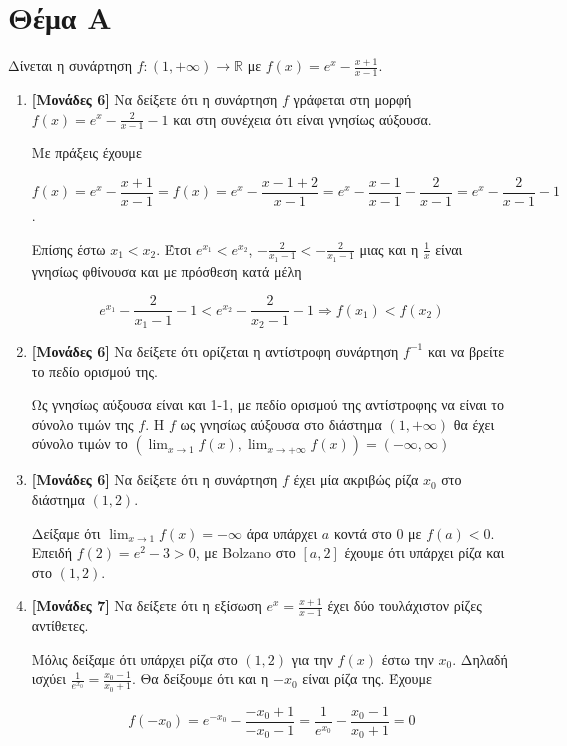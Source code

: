\documentclass[12pt]{article}
\begin{document}
\section*{Θέμα Α}
  \noindent
  Δίνεται η συνάρτηση $f:(1,+\infty)\to \mathbb{R}$ με $f(x)=e^x-\frac{x+1}{x-1}$.
  \begin{enumerate}
    \item \textbf{[Μονάδες 6]} Να δείξετε ότι η συνάρτηση $f$ γράφεται στη μορφή $f(x)=e^x-\frac{2}{x-1}-1$ και στη συνέχεια ότι είναι γνησίως αύξουσα.

    Με πράξεις έχουμε

    $$f(x)=e^x-\frac{x+1}{x-1}=f(x)=e^x-\frac{x-1+2}{x-1}=e^x-\frac{x-1}{x-1}-\frac{2}{x-1}=e^x-\frac{2}{x-1}-1$$.

    Επίσης έστω $x_1<x_2$. Έτσι $e^{x_1}<e^{x_2}$, $-\frac{2}{x_1-1}<-\frac{2}{x_1-1}$ μιας και η $\frac{1}{x}$ είναι γνησίως φθίνουσα και με πρόσθεση κατά μέλη

$$e^{x_1}-\frac{2}{x_1-1}-1<e^{x_2}-\frac{2}{x_2-1}-1\Rightarrow f(x_1)<f(x_2)$$


    \item \textbf{[Μονάδες 6]} Να δείξετε ότι ορίζεται η αντίστροφη συνάρτηση $f^{-1}$ και να βρείτε το πεδίο ορισμού της.

    Ως γνησίως αύξουσα είναι και 1-1, με πεδίο ορισμού της αντίστροφης να είναι το σύνολο τιμών της $f$. Η $f$ ως γνησίως αύξουσα
    στο διάστημα $(1,+\infty)$ θα έχει σύνολο τιμών το $(\lim_{x\to 1}f(x),\lim_{x\to +\infty}f(x))=(-\infty,\infty)$

    \item \textbf{[Μονάδες 6]} Να δείξετε ότι η συνάρτηση $f$ έχει μία ακριβώς ρίζα $x_0$ στο διάστημα $(1,2)$.

    Δείξαμε ότι $\lim_{x\to 1}f(x)=-\infty$ άρα υπάρχει $a$ κοντά στο $0$ με $f(a)<0$. Επειδή $f(2)=e^2-3>0$, με Bolzano στο $[a,2]$ έχουμε ότι υπάρχει ρίζα και στο $(1,2)$.

    \item \textbf{[Μονάδες 7]} Να δείξετε ότι η εξίσωση $e^x=\frac{x+1}{x-1}$ έχει δύο τουλάχιστον ρίζες αντίθετες.

    Μόλις δείξαμε ότι υπάρχει ρίζα στο $(1,2)$ για την $f(x)$ έστω την $x_0$. Δηλαδή ισχύει $\frac{1}{e^{x_0}}=\frac{x_0-1}{x_0+1}$. Θα δείξουμε ότι και η $-x_0$ είναι ρίζα της. Έχουμε

    $$f(-x_0)=e^{-x_0}-\frac{-x_0+1}{-x_0-1}=\frac{1}{e^{x_0}}-\frac{x_0-1}{x_0+1}=0$$

  \end{enumerate}
\end{document}
